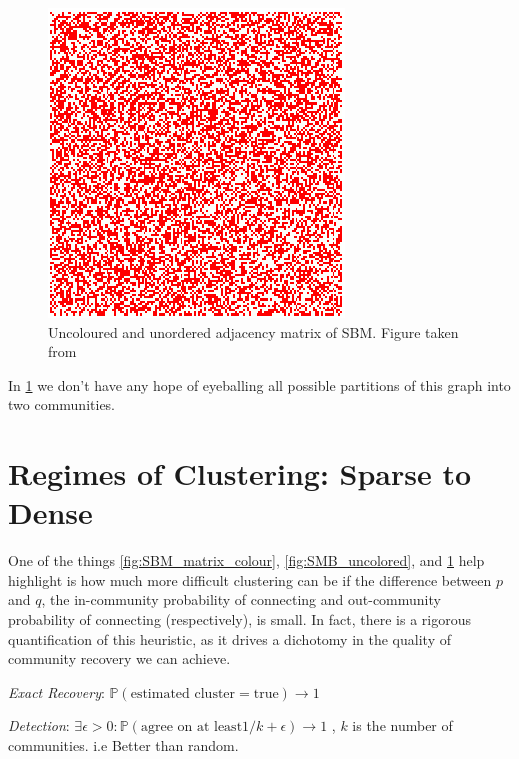 \begin{figure}[h]
\begin{center}
  \includegraphics[scale=0.5]{SBM_unordered}
  \caption{Uncoloured and unordered adjacency matrix of SBM.  Figure taken from \cite{SBM_adjacency_talk}}
  \label{fig:SMB_unordered}
 \end{center}
\end{figure}

In \ref{fig:SMB_unordered} we don't have any hope of eyeballing all possible partitions of this graph into two communities.  

\section{Regimes of Clustering: Sparse to Dense}

One of the things \ref{fig:SBM_matrix_colour}, \ref{fig:SMB_uncolored}, and \ref{fig:SMB_unordered} help highlight is how much more difficult clustering can be if the difference between $p$ and $q$, the in-community probability of connecting and out-community probability of connecting (respectively), is small.  In fact, there is a rigorous quantification of this heuristic, as it drives a dichotomy in the quality of community recovery we can achieve. 

\begin{definition}
\textit{Exact Recovery}: $\mathbb{P}(\text{estimated cluster} = \text{true}) \rightarrow 1$ 
\end{definition}

\begin{definition}
\textit{Detection}: $\exists \epsilon > 0 : \mathbb{P}(\text{agree on at least} 1/k+\epsilon) \rightarrow 1$ , $k$ is the number of communities. i.e Better than random.
\end{definition}

